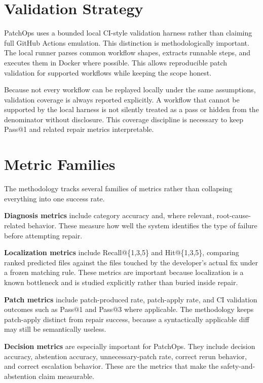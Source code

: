 \section{Validation Strategy}

PatchOps uses a bounded local CI-style validation harness rather than claiming full GitHub Actions emulation.
This distinction is methodologically important. The local runner parses common workflow shapes, extracts runnable
steps, and executes them in Docker where possible. This allows reproducible patch validation for supported
workflows while keeping the scope honest.

Because not every workflow can be replayed locally under the same assumptions, validation coverage is always
reported explicitly. A workflow that cannot be supported by the local harness is not silently treated as a pass
or hidden from the denominator without disclosure. This coverage discipline is necessary to keep Pass@1 and
related repair metrics interpretable.

\section{Metric Families}

The methodology tracks several families of metrics rather than collapsing everything into one success rate.

\textbf{Diagnosis metrics} include category accuracy and, where relevant, root-cause-related behavior. These
measure how well the system identifies the type of failure before attempting repair.

\textbf{Localization metrics} include Recall@\{1,3,5\} and Hit@\{1,3,5\}, comparing ranked predicted files
against the files touched by the developer's actual fix under a frozen matching rule. These metrics are
important because localization is a known bottleneck and is studied explicitly rather than buried inside repair.

\textbf{Patch metrics} include patch-produced rate, patch-apply rate, and CI validation outcomes such as
Pass@1 and Pass@3 where applicable. The methodology keeps patch-apply distinct from repair success, because a
syntactically applicable diff may still be semantically useless.

\textbf{Decision metrics} are especially important for PatchOps. They include decision accuracy, abstention
accuracy, unnecessary-patch rate, correct rerun behavior, and correct escalation behavior. These are the
metrics that make the safety-and-abstention claim measurable.

